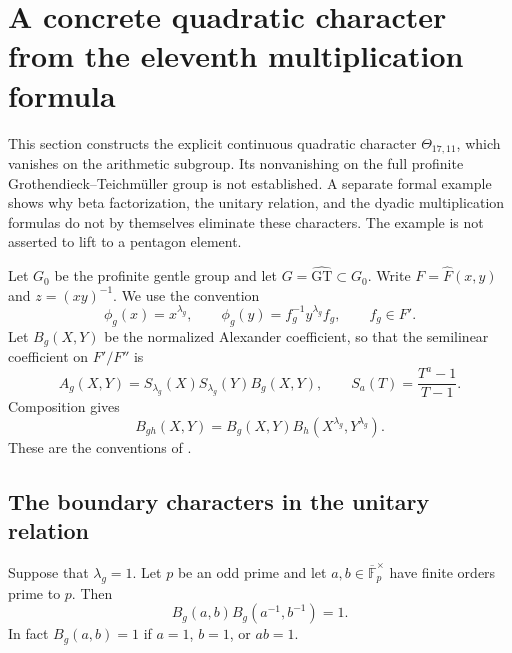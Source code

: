 \section{A concrete quadratic character from the eleventh multiplication formula}
\label{sec:odd-anderson-characters}

This section constructs the explicit continuous quadratic character
$\Theta_{17,11}$, which vanishes on the arithmetic subgroup.  Its
nonvanishing on the full
profinite Grothendieck--Teichm\"uller group is not established.  A separate
formal example shows why beta factorization, the unitary relation, and
the dyadic multiplication formulas do not by themselves eliminate these
characters.  The example is not asserted to lift to a pentagon element.

Let $G_0$ be the profinite gentle group and let
$G=\widehat{\mathrm{GT}}\subset G_0$.  Write
$F=\widehat F(x,y)$ and $z=(xy)^{-1}$.  We use the convention
\[
 \phi_g(x)=x^{\lambda_g},\qquad
 \phi_g(y)=f_g^{-1}y^{\lambda_g}f_g,
 \qquad f_g\in F'.
\]
Let $B_g(X,Y)$ be the normalized Alexander coefficient, so that the
semilinear coefficient on $F'/F''$ is
\[
 A_g(X,Y)=S_{\lambda_g}(X)S_{\lambda_g}(Y)B_g(X,Y),
 \qquad S_a(T)=\frac{T^a-1}{T-1}.
\]
Composition gives
\begin{equation}
 B_{gh}(X,Y)=B_g(X,Y)
                 B_h(X^{\lambda_g},Y^{\lambda_g}).
 \label{eq:odd-beta-cocycle}
\end{equation}
These are the conventions of \cite[\S2.3, p.~101]{Furusho2003}.

\subsection{The boundary characters in the unitary relation}

\begin{lemma}\label{lem:all-finite-unitarity}
Suppose that $\lambda_g=1$.  Let $p$ be an odd prime and let
$a,b\in\overline{\mathbb F}_p^\times$ have finite orders prime to $p$.
Then
\[
 B_g(a,b)B_g(a^{-1},b^{-1})=1.
\]
In fact $B_g(a,b)=1$ if $a=1$, $b=1$, or $ab=1$.
\end{lemma}


